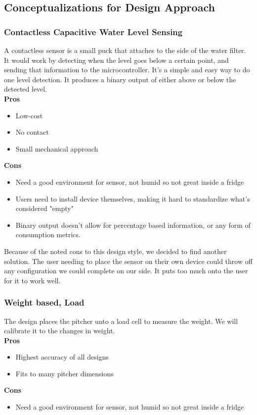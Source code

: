 \subsection{Conceptualizations for Design Approach}
\subsubsection{Contactless Capacitive Water Level Sensing}
A contactless sensor is a small puck that attaches to the side of the water filter. It would work by detecting when the level goes below a certain point, and sending that information to the microcontroller. It's a simple and easy way to do one level detection. It produces a binary output of either above or below the detected level.\\
\noindent\textbf{Pros}
    \begin{itemize}
    \item Low-cost
    \item No contact
    \item Small mechanical approach
    \end{itemize}
\noindent\textbf{Cons}
    \begin{itemize}
    \item Need a good environment for sensor, not humid so not great inside a fridge
    \item Users need to install device themselves, making it hard to standardize what's considered "empty"
    \item Binary output doesn't allow for percentage based information, or any form of consumption metrics. 
    \end{itemize}
    
Because of the noted cons to this design style, we decided to find another solution. The user needing to place the sensor on their own device could throw off any configuration we could complete on our side. It puts too much onto the user for it to work well. 

\subsubsection{Weight based, Load}
The design places the pitcher unto a load cell to measure the weight. We will calibrate it to the changes in weight.\\
\noindent\textbf{Pros}
    \begin{itemize}
    \item Highest accuracy of all designs
    \item Fits to many pitcher dimensions
    \end{itemize}
\noindent\textbf{Cons}
    \begin{itemize}
    \item Need a good environment for sensor, not humid so not great inside a fridge
    \end{itemize}

